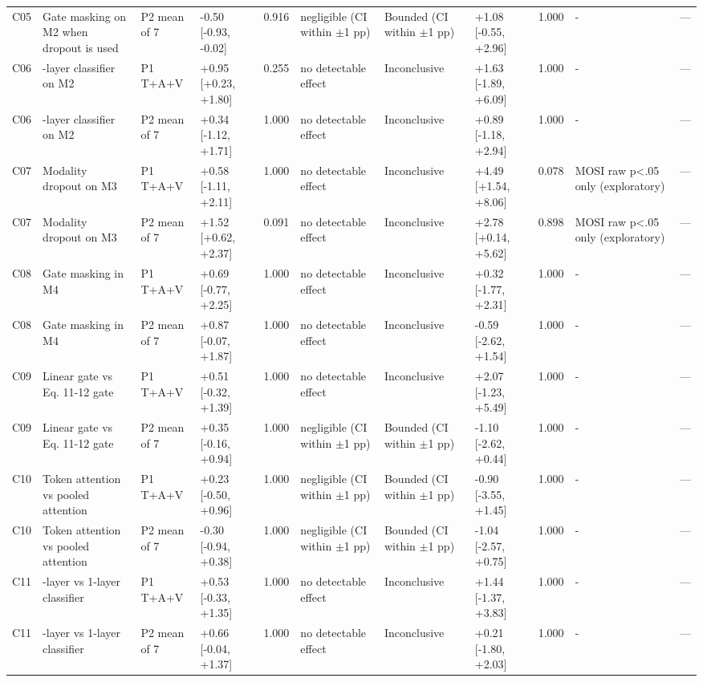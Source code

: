\begin{table}
{\begin{tabularx}{1.42\textheight}{l>{\raggedright\arraybackslash}Xlll>{\raggedright\arraybackslash}X>{\raggedright\arraybackslash}Xll>{\raggedright\arraybackslash}Xl}
C05 & Gate masking on M2 when dropout is used & P2 mean of 7 & -0.50 [-0.93, -0.02] & 0.916 & negligible (CI within $\pm$1 pp) & Bounded (CI within $\pm$1 pp) & +1.08 [-0.55, +2.96] & 1.000 & - & — \\
C06 & 2-layer classifier on M2 & P1 T+A+V & +0.95 [+0.23, +1.80] & 0.255 & no detectable effect & Inconclusive & +1.63 [-1.89, +6.09] & 1.000 & - & — \\
C06 & 2-layer classifier on M2 & P2 mean of 7 & +0.34 [-1.12, +1.71] & 1.000 & no detectable effect & Inconclusive & +0.89 [-1.18, +2.94] & 1.000 & - & — \\
C07 & Modality dropout on M3 & P1 T+A+V & +0.58 [-1.11, +2.11] & 1.000 & no detectable effect & Inconclusive & +4.49 [+1.54, +8.06] & 0.078 & MOSI raw p<.05 only (exploratory) & — \\
C07 & Modality dropout on M3 & P2 mean of 7 & +1.52 [+0.62, +2.37] & 0.091 & no detectable effect & Inconclusive & +2.78 [+0.14, +5.62] & 0.898 & MOSI raw p<.05 only (exploratory) & — \\
C08 & Gate masking in M4 & P1 T+A+V & +0.69 [-0.77, +2.25] & 1.000 & no detectable effect & Inconclusive & +0.32 [-1.77, +2.31] & 1.000 & - & — \\
C08 & Gate masking in M4 & P2 mean of 7 & +0.87 [-0.07, +1.87] & 1.000 & no detectable effect & Inconclusive & -0.59 [-2.62, +1.54] & 1.000 & - & — \\
C09 & Linear gate vs Eq. 11-12 gate & P1 T+A+V & +0.51 [-0.32, +1.39] & 1.000 & no detectable effect & Inconclusive & +2.07 [-1.23, +5.49] & 1.000 & - & — \\
C09 & Linear gate vs Eq. 11-12 gate & P2 mean of 7 & +0.35 [-0.16, +0.94] & 1.000 & negligible (CI within $\pm$1 pp) & Bounded (CI within $\pm$1 pp) & -1.10 [-2.62, +0.44] & 1.000 & - & — \\
C10 & Token attention vs pooled attention & P1 T+A+V & +0.23 [-0.50, +0.96] & 1.000 & negligible (CI within $\pm$1 pp) & Bounded (CI within $\pm$1 pp) & -0.90 [-3.55, +1.45] & 1.000 & - & — \\
C10 & Token attention vs pooled attention & P2 mean of 7 & -0.30 [-0.94, +0.38] & 1.000 & negligible (CI within $\pm$1 pp) & Bounded (CI within $\pm$1 pp) & -1.04 [-2.57, +0.75] & 1.000 & - & — \\
C11 & 2-layer vs 1-layer classifier & P1 T+A+V & +0.53 [-0.33, +1.35] & 1.000 & no detectable effect & Inconclusive & +1.44 [-1.37, +3.83] & 1.000 & - & — \\
C11 & 2-layer vs 1-layer classifier & P2 mean of 7 & +0.66 [-0.04, +1.37] & 1.000 & no detectable effect & Inconclusive & +0.21 [-1.80, +2.03] & 1.000 & - & — \\

\end{tabularx}}
\end{table}
